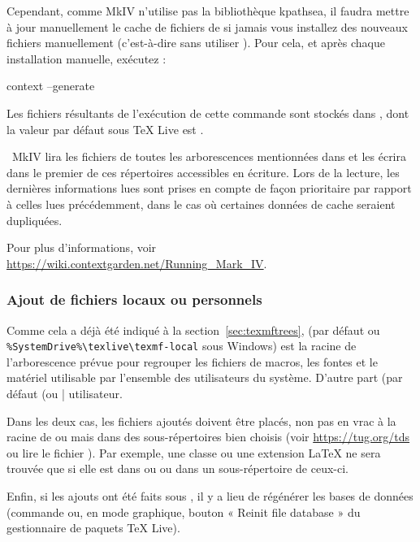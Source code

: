 \documentclass[german, english, french]{article}
\renewcommand{\TL}{\TeX{} Live\xspace}%
\begin{document}
Cependant, comme \ConTeXt{} MkIV n'utilise pas la bibliothèque kpathsea, il
faudra mettre à jour manuellement le cache de fichiers de \ConTeXt{} si jamais
vous installez des nouveaux fichiers manuellement (c'est-à-dire sans utiliser
). Pour cela, et après chaque installation manuelle, exécutez :
\begin{sverbatim}
context --generate
\end{sverbatim}
Les fichiers résultants de l'exécution de cette commande sont stockés dans
, dont la valeur par défaut sous \TL{} est
.

\ConTeXt\ MkIV lira les fichiers de toutes les arborescences mentionnées dans
 et les écrira dans le premier de ces répertoires
accessibles en écriture. Lors de la lecture, les dernières informations lues
sont prises en compte de façon prioritaire par rapport à celles lues
précédemment, dans le cas où certaines données de cache seraient dupliquées.

Pour plus d'informations, voir
\url{https://wiki.contextgarden.net/Running_Mark_IV}.


\subsubsection{Ajout de fichiers locaux ou personnels}
\label{sec:local-personal-macros}

Comme cela a déjà été indiqué à la section~\ref{sec:texmftrees},
 (par défaut  ou
\verb|%SystemDrive%\texlive\texmf-local| sous Windows) est la racine de
l'arborescence prévue pour regrouper les fichiers de macros, les fontes et le
matériel utilisable par l'ensemble des utilisateurs du système.  D'autre part
 (par défaut  %
(ou |%
utilisateur.

Dans les deux cas, les fichiers ajoutés doivent être placés, non pas en vrac
à la racine de  ou  mais dans des
sous-répertoires bien choisis (voir \url{https://tug.org/tds} ou lire le fichier
). Par exemple, une classe ou une extension \LaTeX{} ne sera
trouvée que si elle est dans  ou
 ou dans un sous-répertoire de ceux-ci.

Enfin, si les ajouts ont été faits sous , il y a lieu de
régénérer les bases de données  (commande  ou,
en mode graphique, bouton « Reinit file database » du gestionnaire de paquets
\TL).
\end{document}

